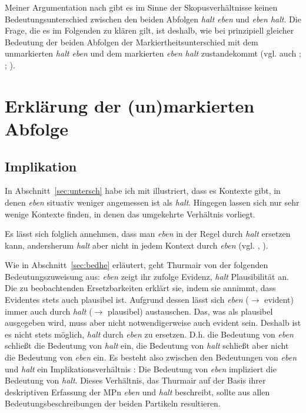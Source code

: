 Meiner Argumentation nach gibt es im Sinne der Skopusverhältnisse keinen Bedeutungsunterschied zwischen den beiden Abfolgen \textit{halt eben} und \textit{eben halt}. Die Frage, die es im Folgenden zu klären gilt, ist deshalb, wie bei prinzipiell glei\-cher Bedeutung der beiden Abfolgen der Markiertheitsunterschied mit dem unmarkierten \textit{halt eben} und dem markierten \textit{eben halt} zustandekommt (vgl. auch \citealt[162-164]{Mueller2016a}; \citeyear[169-177]{Mueller2016b}; \citeyear[244-248]{Mueller2017a}).

\section{Erklärung der (un)markierten Abfolge}
\label{sec:erklärunghe}
\subsection{Implikation}
\label{sec:impli}
In Abschnitt~\ref{sec:untersch} habe ich mit \citet{Thurmair1989} illustriert, dass es Kontexte gibt, in denen \textit{eben} situativ weniger angemessen ist als \textit{halt}. Hingegen lassen sich nur sehr wenige Kontexte finden, in denen das umgekehrte Verhältnis vorliegt. 

Es lässt sich folglich annehmen, dass man \textit{eben} in der Regel durch \textit{halt} ersetzen kann, andersherum \textit{halt} aber nicht in jedem Kontext durch \textit{eben} (vgl. \citealt[128]{Thurmair1989}, \citealt[392]{Ickler1994}).

Wie in Abschnitt~\ref{sec:bedhe} erläutert, geht Thurmair von der folgenden Bedeutungszu\-weisung aus: \textit{eben} zeigt ihr zufolge Evidenz, \textit{halt} Plausibilität an. Die zu beobachtenden Ersetzbarkeiten erklärt sie, indem sie annimmt, dass Evidentes stets auch plausibel ist. Aufgrund dessen lässt sich \textit{eben} ($\rightarrow$ evident) immer auch durch \textit{halt} ($\rightarrow$ plausibel) austauschen. Das, was als plausibel ausgegeben wird, muss aber nicht notwendigerweise auch evident sein. Deshalb ist es nicht stets möglich, \textit{halt} durch \textit{eben} zu ersetzen. D.h. die Bedeutung von \textit{eben} schließt die Bedeutung von \textit{halt} ein, die Bedeutung von \textit{halt} schließt aber nicht die Bedeutung von \textit{eben} ein. Es besteht also zwischen den Bedeutungen von \textit{eben} und \textit{halt} ein Im\-plikationsverhältnis : Die Bedeutung von \textit{eben} impliziert die Bedeutung von \textit{halt}. Dieses Verhältnis, das Thurmair auf der Basis ihrer deskriptiven Erfassung der MPn \textit{eben} und \textit{halt} beschreibt, sollte aus allen Bedeutungsbeschreibungen der beiden Partikeln resultieren. 

